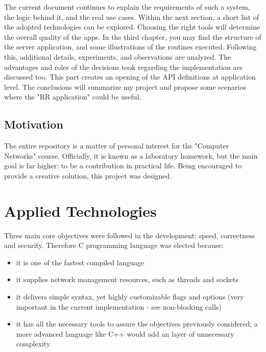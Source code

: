 \documentclass[runningheads]{llncs}
\begin{document}
The current document continues to explain the requirements of such a system, the logic behind it, and the real use cases. Within the next section, a short list of the adopted technologies can be explored. Choosing the right tools will determine the overall quality of the apps. In the third chapter, you may find the structure of the server application, and some illustrations of the routines executed. Following this, additional details, experiments, and observations are analyzed. The advantages and roles of the decisions took regarding the implementation are discussed too. This part creates an opening of the API definitions at application level. The conclusions will summarize my project and propose some scenarios where the "RR application" could be useful.

\subsection{Motivation}

The entire repository is a matter of personal interest for the "Computer Networks" course. Officially, it is known as a laboratory homework, but the main goal is far higher: to be a contribution in practical life. Being encouraged to provide a creative solution, this project was designed.


\section{Applied Technologies}

Three main core objectives were followed in the development: speed, correctness and security. Therefore C programming language was elected because:
\begin{itemize}
    \item it is one of the fastest compiled language 
    \item it supplies network management resources, such as threads and sockets
    \item it delivers simple syntax, yet highly customizable flags and options (very important in the current implementation - see non-blocking calls)
    \item it has all the necessary tools to assure the objectives previously considered; a more advanced language like C++ would add an layer of unnecessary complexity
\end{itemize}
\end{document}
